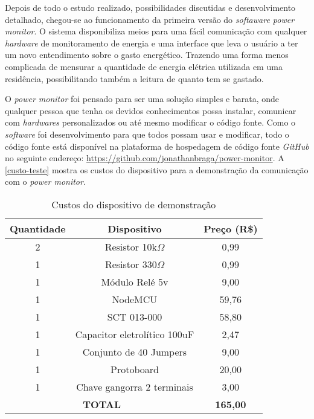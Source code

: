 Depois de todo o estudo realizado, possibilidades discutidas e desenvolvimento detalhado, chegou-se ao  funcionamento da primeira versão
do \textit{softaware power monitor}. O sistema disponibiliza meios para uma fácil comunicação com qualquer \textit{hardware} de monitoramento
de energia e uma interface que leva o usuário a ter um novo entendimento sobre o gasto energético. Trazendo uma forma menos
complicada de mensurar a quantidade de energia elétrica utilizada em uma residência, possibilitando também a leitura de quanto tem se gastado.

O \textit{power monitor} foi pensado para ser uma solução simples e barata, onde qualquer pessoa que tenha os devidos conhecimentos possa 
instalar, comunicar com \textit{hardwares} personalizados ou até mesmo modificar o código fonte. Como o \textit{software} foi desenvolvimento 
para que todos possam usar e modificar, todo o código fonte está disponível na plataforma de hospedagem de código fonte 
\textit{GitHub} no seguinte endereço: \url{https://github.com/jonathanbraga/power-monitor}{}. A \autoref{custo-teste} mostra os 
custos do dispositivo para a demonstração da comunicação com o \textit{power monitor}.


\begin{table}[!ht]
	\centering
	\begin{tabular}{ccc}
		\hline
		\textbf{Quantidade} & \textbf{Dispositivo}               & \textbf{Preço (R\$)}                 \\ \hline
		\rowcolor[HTML]{DDDDDD} 
		2                   & Resistor 10k$\Omega$ & 0,99                                 \\
		1                   & Resistor 330$\Omega$ & 0,99                                 \\
		\rowcolor[HTML]{DDDDDD} 
		1                   & Módulo Relé 5v                     & 9,00                                 \\
		1                   & NodeMCU                            & 59,76                                \\
		\rowcolor[HTML]{DDDDDD} 
		1                   & SCT 013-000                        & 58,80                                \\
		1                   & Capacitor eletrolítico 100uF       & 2,47                                 \\
		\rowcolor[HTML]{DDDDDD} 
		1                   & Conjunto de 40 Jumpers             & 9,00                                 \\
		1                   & Protoboard             & 20,00                                 \\
		\rowcolor[HTML]{DDDDDD} 
		1                   & Chave gangorra 2 terminais         & 3,00                                 \\ \hline
		\multicolumn{2}{|c|}{\textbf{TOTAL}}                     & \multicolumn{1}{c|}{\textbf{165,00}} \\ \hline
	\end{tabular}
	\caption{Custos do dispositivo de demonstração}
	\label{custo-teste}
\end{table} 